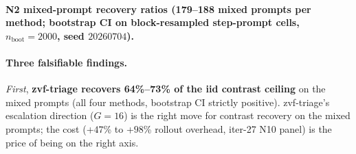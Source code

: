 \paragraph{N2 mixed-prompt recovery ratios (179--188 mixed prompts
per method; bootstrap CI on block-resampled step-prompt cells,
$n_{\mathrm{boot}}{=}2000$, seed $20260704$).}

\begin{table}[t]
\centering
\caption{Recovery ratios on the N2 four-method mixed prompts.
$\rho(z_{\mathrm{step}}, \mathrm{mean\_headroom\_at\_step})$ is the
Pearson correlation between the step-level ZVF signal each step-level
controller acts on and the per-prompt headroom ceiling that recovery
would consume. $\rho \le 0.31$ across all four methods: the step-level
ZVF is a POOR predictor of per-prompt headroom.}
\label{tab:p7-headroom-recovery}
\end{table}

\paragraph{Three falsifiable findings.}

\emph{First}, \textbf{zvf-triage recovers 64\%--73\% of the iid
contrast ceiling} on the mixed prompts (all four methods, bootstrap CI
strictly positive). zvf-triage's escalation direction ($G{=}16$) is
the right move for contrast recovery on the mixed prompts; the cost
(+$47$\% to +$98$\% rollout overhead, iter-27 N10 panel) is the price
of being on the right axis.

